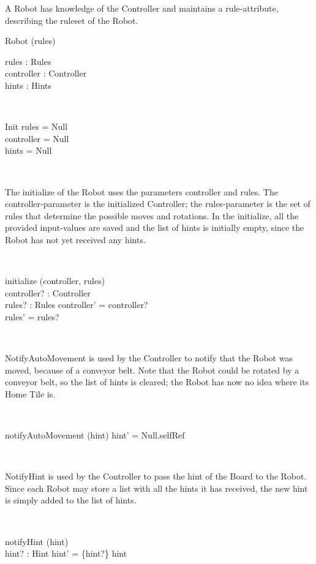 \documentclass[12pt]{article}
\begin{document}
A Robot has knowledge of the Controller and maintains a rule-attribute, describing the ruleset of the Robot.
\begin{class}{Robot}
\upharpoonright (rules) \\
\begin{state}
rules : Rules \\
controller : Controller \\
hints : \power Hints
\end{state}\\
\begin{schema}{Init}
rules = Null \\
controller = Null \\
hints = Null
\end{schema} \\
\begin{classcom}
The initialize of the Robot uses the parameters controller and rules. The controller-parameter is the initialized Controller; the rules-parameter is the set of rules that determine the possible moves and rotations. In the initialize, all the provided input-values are saved and the list of hints is initially empty, since the Robot has not yet received any hints.
\end{classcom} \\
\begin{schema}{initialize}
\Delta (controller, rules) \\
controller? : Controller \\
rules? : Rules
\where
controller' = controller? \\
rules' = rules? \\
\end{schema} \\
\begin{classcom}
NotifyAutoMovement is used by the Controller to notify that the Robot was moved, because of a conveyor belt. Note that the Robot could be rotated by a conveyor belt, so the list of hints is cleared; the Robot has now no idea where its Home Tile is.
\end{classcom} \\
\begin{schema}{notifyAutoMovement}
\Delta (hint)
\where
hint' = Null.selfRef
\end{schema}\\
\begin{classcom}
NotifyHint is used by the Controller to pass the hint of the Board to the Robot. Since each Robot may store a list with all the hints it has received, the new hint is simply added to the list of hints.
\end{classcom} \\
\begin{schema}{notifyHint}
\Delta (hint) \\
hint? : Hint
\where
hint' = \{hint?\} \union hint
\end{schema}
\end{class}
\end{document}
